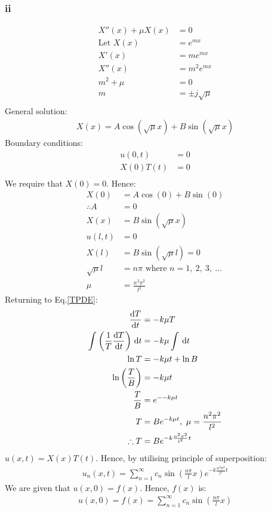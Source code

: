 \documentclass[11pt]{article}
\numberwithin{equation}{section}
\begin{document}
\subsubsection*{ii}
\begin{align}
	X''(x) + \mu X(x) &= 0\\
	\textrm{Let } X(x) &= e^{mx}\\
	X'(x) &= me^{mx}\\
	X''(x) &= m^2e^{mx}\\
	m^2 + \mu &= 0\\
	m &= \pm j\sqrt{\mu}\\
\end{align}
General solution:
\begin{align}
	X(x) = A\cos\left(\sqrt{\mu}x\right) + B\sin\left(\sqrt{\mu}x\right)
\end{align}
Boundary conditions:
\begin{align}
	u\left(0,t\right) &= 0\\
	X(0)T(t) &= 0\\
\end{align}
We require that $X(0) = 0$. Hence:
\begin{align}
	X(0) &= A\cos\left(0\right) + B\sin\left(0\right)\\
	\therefore A &= 0\\
	X(x) &= B \sin\left(\sqrt{\mu}x\right)\\
	u\left(l,t\right) &= 0\\
	X(l) &= B\sin\left(\sqrt{\mu}l\right) = 0\\
	\sqrt{\mu}l &= n\pi \textrm{ where } n = 1, \ 2, \ 3, \ ... \\
	\mu &= \frac{n^2 \pi^2}{l^2}
\end{align}
Returning to Eq.\ref{TPDE}:
\begin{align}
	\frac{\dif T}{\dif t} &= -k\mu T\\
	\int_{}^{} \left(\frac{1}{T}\frac{\dif T}{\dif t}\right) \,\dif t &= -k\mu \int_{}^{}  \,\dif t\\
	\ln T &= -k \mu t + \ln B\\
	\ln \left(\frac{T}{B}\right) &= - k\mu t\\
	\frac{T}{B} &= e^{--k\mu t}\\
	T &= Be^{-k\mu t}, \ \mu = \frac{n^2 \pi^2}{l^2} \\
	\therefore T &= Be^{-k \frac{n^2 \pi^2}{l^2}t} 
\end{align}
$u(x,t) = X(x)T(t)$. Hence, by utilising principle of superposition:
\begin{align}
	u_n(x,t) = \sum_{n=1}^{\infty} c_n \sin\left(\frac{n\pi}{l}x\right)e^{-k \frac{n^2 \pi^2}{l^2}t}
\end{align}
We are given that $u(x, 0) = f(x)$. Hence, $f(x)$ is:
\begin{align}
	u(x,0) = f(x) = \sum_{n=1}^{\infty} c_n \sin\left(\frac{n\pi}{l}x\right)
\end{align}
\end{document}
